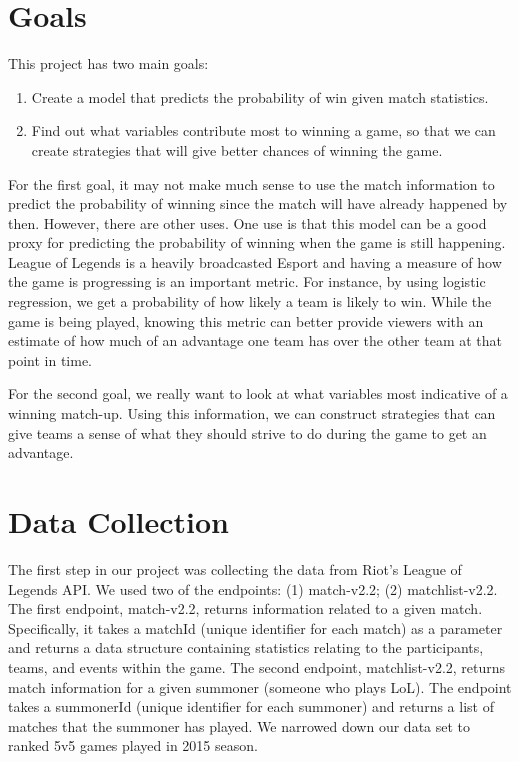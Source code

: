 \documentclass[runningheads]{llncs}
\begin{document}
	\section{Goals}
	
	This project has two main goals:
	\begin{enumerate}
		\item
		Create a model that predicts the probability of win given match statistics.
		
		\item
		Find out what variables contribute most to winning a game, so that we can create strategies that will give better chances of winning the game.		
	\end{enumerate}
	
	For the first goal, it may not make much sense to use the match information to predict the probability of winning since the match will have already happened by then. However, there are other uses. One use is that this model can be a good proxy for predicting the probability of winning when the game is still happening. League of Legends is a heavily broadcasted Esport and having a measure of how the game is progressing is an important metric. For instance, by using logistic regression, we get a probability of how likely a team is likely to win. While the game is being played, knowing this metric can better provide viewers with an estimate of how much of an advantage one team has over the other team at that point in time.
	
	For the second goal, we really want to look at what variables most indicative of a winning match-up. Using this information, we can construct strategies that can give teams a sense of what they should strive to do during the game to get an advantage.
	
	\section{Data Collection}

	The first step in our project was collecting the data from Riot’s League of Legends API. We used two of the endpoints: (1) match-v2.2; (2) matchlist-v2.2. The first endpoint, match-v2.2, returns information related to a given match. Specifically, it takes a matchId (unique identifier for each match) as a parameter and returns a data structure containing statistics relating to the participants, teams, and events within the game. The second endpoint, matchlist-v2.2, returns match information for a given summoner (someone who plays LoL). The endpoint takes a summonerId (unique identifier for each summoner) and returns a list of matches that the summoner has played. We narrowed down our data set to ranked 5v5 games played in 2015 season.
\end{document}
